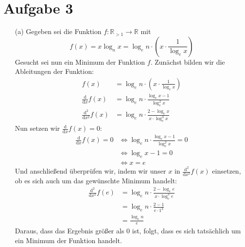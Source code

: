 \documentclass{scrartcl}
\begin{document}
\section{Aufgabe 3}
\begin{enumerate}
\item[(a)]
Gegeben sei die Funktion $f : \mathbb{R}_{>1} \to \mathbb{R}$ mit
\[
    f(x) = x \log_n x = \log_e n \cdot \left( x \cdot \frac{1}{\log_e x} \right)
\]
Gesucht sei nun ein Minimum der Funktion $f$. Zunächst bilden wir die
Ableitungen der Funktion:
\begin{align*}
f(x) &= \log_e n \cdot \left( x \cdot \frac{1}{\log_e x} \right) \\
\frac{\mathrm d}{\mathrm d x} f(x) &= \log_e n \cdot \frac{\log_e x - 1}{\log_e^2 x} \\
\frac{\mathrm d^2}{\mathrm d x^2} f(x) &= \log_e n \cdot \frac{2 - \log_e x}{x \cdot \log_e^3 x}
\end{align*}
Nun setzen wir $\frac{\mathrm d}{\mathrm d x} f(x) = 0$:
\begin{align*}
\frac{\mathrm d}{\mathrm d x} f(x) = 0 
    &\Leftrightarrow \log_e n \cdot \frac{\log_e x - 1}{\log_e^2 x} = 0 \\
    &\Leftrightarrow \log_e x - 1 = 0 \\
    &\Leftrightarrow x = e
\end{align*}
Und anschließend überprüfen wir, indem wir unser $x$ in $\frac{\mathrm
d^2}{\mathrm d x^2} f(x)$ einsetzen, ob es sich auch um das gewünschte Minimum
handelt:
\begin{align*}
\frac{\mathrm d^2}{\mathrm d x^2} f(e) &= \log_e n \cdot \frac{2 - \log_e e}{x
\cdot \log_e^3 e} \\
&= \log_e n \cdot \frac{2 - 1}{e \cdot 1^3} \\
&= \frac{\log_e n}{e}
\end{align*}
Daraus, dass das Ergebnis größer als 0 ist, folgt, dass es sich tatsächlich um
ein Minimum der Funktion handelt.

\end{enumerate}
\end{document}
